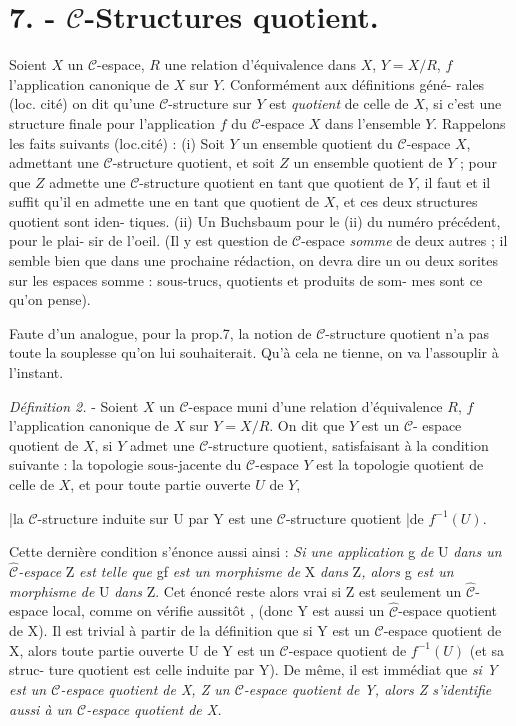 \section*{7. - $\mathcal{C}$-Structures quotient.}

Soient $X$ un $\mathcal{C}$-espace, $R$ une relation d'équivalence dans $X$, $Y = X/R$,
$f$ l'application canonique de $X$ sur $Y$. Conformément aux définitions géné-
rales (loc. cité) on dit qu'une $\mathcal{C}$-structure sur $Y$ est \emph{quotient} de celle
de $X$, si c'est une structure finale pour l'application $f$ du $\mathcal{C}$-espace $X$
dans l'ensemble $Y$. Rappelons les faits suivants (loc.cité) : (i) Soit $Y$ un
ensemble quotient du $\mathcal{C}$-espace $X$, admettant une $\mathcal{C}$-structure quotient,
et soit $Z$ un ensemble quotient de $Y$ ; pour que $Z$ admette une $\mathcal{C}$-structure
quotient en tant que quotient de $Y$, il faut et il suffit qu'il en admette
une en tant que quotient de $X$, et ces deux structures quotient sont iden-
tiques. (ii) Un Buchsbaum pour le (ii) du numéro précédent, pour le plai-
sir de l'oeil. (Il y est question de $\mathcal{C}$-espace \emph{somme} de deux autres ;
il semble bien que dans une prochaine rédaction, on devra dire un ou deux
sorites sur les espaces somme : sous-trucs, quotients et produits de som-
mes sont ce qu'on pense).

Faute d'un analogue, pour la prop.7, la notion de $\mathcal{C}$-structure quotient
n'a pas toute la souplesse qu'on lui souhaiterait. Qu'à cela ne tienne,
on va l'assouplir à l'instant.

\emph{Définition 2.} - Soient $X$ un $\mathcal{C}$-espace muni d'une relation d'équivalence
$R$, $f$ l'application canonique de $X$ sur $Y = X/R$. On dit que $Y$ est un $\mathcal{C}$-
espace quotient de $X$, si $Y$ admet une $\mathcal{C}$-structure quotient, satisfaisant
à la condition suivante : la topologie sous-jacente du $\mathcal{C}$-espace $Y$ est la
topologie quotient de celle de $X$, et pour toute partie ouverte $U$ de $Y$,

\newpage



|la $\mathcal{C}$-structure induite sur U par Y est une $\mathcal{C}$-structure quotient 
|de $f^{-1}(U)$.

Cette dernière condition s'énonce aussi ainsi : \emph{Si une application}
g \emph{de} U \emph{dans un} $\hat{\mathcal{C}}$\emph{-espace} Z \emph{est telle que} gf \emph{est un morphisme de} X \emph{dans}
Z\emph{, alors} g \emph{est un morphisme de} U \emph{dans} Z. Cet énoncé reste alors vrai
si Z est seulement un $\hat{\mathcal{C}}$-espace local, comme on vérifie aussitôt ,
(donc Y est aussi un $\hat{\mathcal{C}}$-espace quotient de X). Il est trivial à partir
de la définition que si Y est un $\mathcal{C}$-espace quotient de X, alors toute
partie ouverte U de Y est un $\mathcal{C}$-espace quotient de $f^{-1}(U)$ (et sa struc-
ture quotient est celle induite par Y). De même, il est immédiat que \emph{si
Y est un $\mathcal{C}$-espace quotient de X, Z un $\mathcal{C}$-espace quotient de Y, alors
Z s'identifie aussi à un $\mathcal{C}$-espace quotient de X.}

